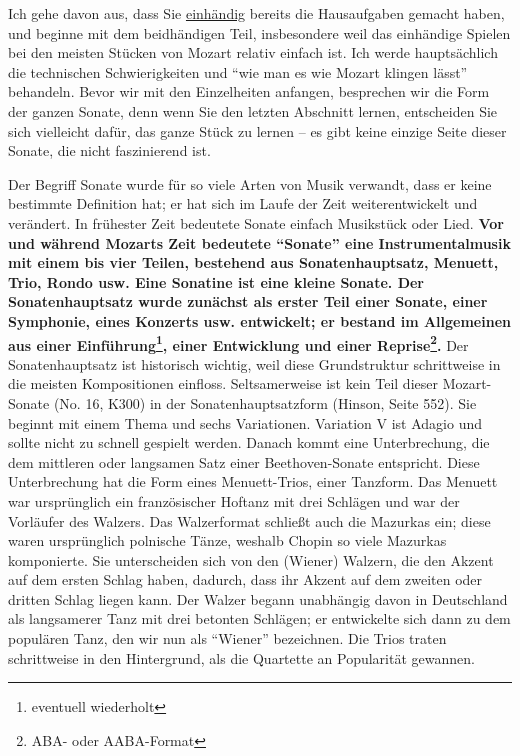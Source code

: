 Ich gehe davon aus, dass Sie \hyperref[c1ii7]{einhändig} bereits die Hausaufgaben gemacht haben, und beginne mit dem beidhändigen Teil, insbesondere weil das einhändige Spielen bei den meisten Stücken von Mozart relativ einfach ist.
Ich werde hauptsächlich die technischen Schwierigkeiten und \enquote{wie man es wie Mozart klingen lässt} behandeln.
Bevor wir mit den Einzelheiten anfangen, besprechen wir die Form der ganzen Sonate, denn wenn Sie den letzten Abschnitt lernen, entscheiden Sie sich vielleicht dafür, das ganze Stück zu lernen -- es gibt keine einzige Seite dieser Sonate, die nicht faszinierend ist.

Der Begriff Sonate wurde für so viele Arten von Musik verwandt, dass er keine bestimmte Definition hat; er hat sich im Laufe der Zeit weiterentwickelt und verändert.
In frühester Zeit bedeutete Sonate einfach Musikstück oder Lied.
\textbf{Vor und während Mozarts Zeit bedeutete \enquote{Sonate} eine Instrumentalmusik mit einem bis vier Teilen, bestehend aus Sonatenhauptsatz, Menuett, Trio, Rondo usw.
Eine Sonatine ist eine kleine Sonate.
Der Sonatenhauptsatz wurde zunächst als erster Teil einer Sonate, einer Symphonie, eines Konzerts usw. entwickelt; er bestand im Allgemeinen aus einer Einführung\footnote{eventuell wiederholt}, einer Entwicklung und einer Reprise\footnote{ABA- oder AABA-Format}.}
Der Sonatenhauptsatz ist historisch wichtig, weil diese Grundstruktur schrittweise in die meisten Kompositionen einfloss. 
Seltsamerweise ist kein Teil dieser Mozart-Sonate (No. 16, K300) in der Sonatenhauptsatzform (Hinson, Seite 552).
Sie beginnt mit einem Thema und sechs Variationen.
Variation V ist Adagio und sollte nicht zu schnell gespielt werden.
Danach kommt eine Unterbrechung, die dem mittleren oder langsamen Satz einer Beethoven-Sonate entspricht.
Diese Unterbrechung hat die Form eines Menuett-Trios, einer Tanzform.
Das Menuett war ursprünglich ein französischer Hoftanz mit drei Schlägen und war der Vorläufer des Walzers.
Das Walzerformat schließt auch die Mazurkas ein; diese waren ursprünglich polnische Tänze, weshalb Chopin so viele Mazurkas komponierte.
Sie unterscheiden sich von den (Wiener) Walzern, die den Akzent auf dem ersten Schlag haben, dadurch, dass ihr Akzent auf dem zweiten oder dritten Schlag liegen kann.
Der Walzer begann unabhängig davon in Deutschland als langsamerer Tanz mit drei betonten Schlägen; er entwickelte sich dann zu dem populären Tanz, den wir nun als \enquote{Wiener} bezeichnen.
Die Trios traten schrittweise in den Hintergrund, als die Quartette an Popularität gewannen.
